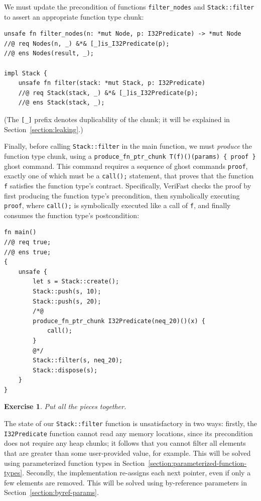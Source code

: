 \documentclass{article}
\newtheorem{exercise}{Exercise}
\begin{document}
We must update the precondition of functions \lstinline|filter_nodes| and \lstinline|Stack::filter| to
assert an appropriate function type chunk:
\begin{lstlisting}
unsafe fn filter_nodes(n: *mut Node, p: I32Predicate) -> *mut Node
//@ req Nodes(n, _) &*& [_]is_I32Predicate(p);
//@ ens Nodes(result, _);

impl Stack {
    unsafe fn filter(stack: *mut Stack, p: I32Predicate)
    //@ req Stack(stack, _) &*& [_]is_I32Predicate(p);
    //@ ens Stack(stack, _);
\end{lstlisting}
(The \lstinline|[_]| prefix denotes duplicability of the chunk; it will be explained in Section~\ref{section:leaking}.)

Finally, before calling \lstinline|Stack::filter| in the main function, we must \emph{produce} the function type chunk, using a \lstinline|produce_fn_ptr_chunk T(f)()(params) { proof }| ghost command. This command requires a sequence of ghost commands \lstinline|proof|, exactly one of which must be a \lstinline|call();| statement, that proves that the function \lstinline|f| satisfies the function type's contract. Specifically, VeriFast checks the proof by first producing the function type's precondition, then symbolically executing \lstinline|proof|, where \lstinline|call();| is symbolically executed like a call of \lstinline|f|, and finally consumes the function type's postcondition:
\begin{lstlisting}
fn main()
//@ req true;
//@ ens true;
{
    unsafe {
        let s = Stack::create();
        Stack::push(s, 10);
        Stack::push(s, 20);
        /*@
        produce_fn_ptr_chunk I32Predicate(neq_20)()(x) {
            call();
        }
        @*/
        Stack::filter(s, neq_20);
        Stack::dispose(s);
    }
}
\end{lstlisting}

\begin{exercise}\label{exercise:filter}
Put all the pieces together.
\end{exercise}

The state of our \lstinline!Stack::filter! function is
unsatisfactory in two ways: firstly, the
\lstinline!I32Predicate! function cannot read any memory
locations, since its precondition does not require any heap
chunks; it follows that you cannot filter all elements that are
greater than some user-provided value, for example. This will
be solved using parameterized function types in
Section~\ref{section:parameterized-function-types}. Secondly, the
implementation re-assigns each next pointer, even if only a few
elements are removed. This will be solved using by-reference
parameters in Section~\ref{section:byref-params}.
\end{document}
